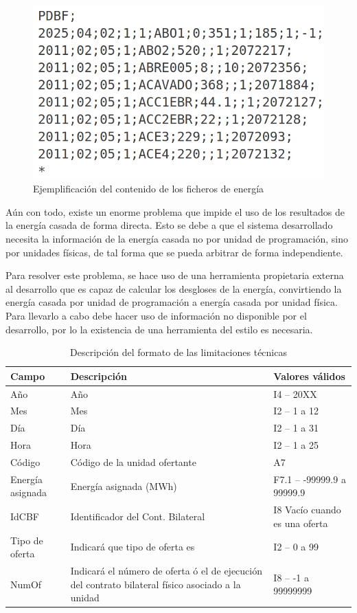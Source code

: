 \begin{figure}
  \centering
  \includegraphics[width=0.5\linewidth]{figures/contenido-energia.png}
  \caption{Ejemplificación del contenido de los ficheros de energía}
  \label{fig:contenido-energia}
\end{figure}

Aún con todo, existe un enorme problema que impide el uso de los resultados de la energía casada de forma directa. Esto se debe a que el sistema desarrollado necesita la información de la energía casada no por unidad de programación, sino por unidades físicas, de tal forma que se pueda arbitrar de forma independiente.

Para resolver este problema, se hace uso de una herramienta propietaria externa al desarrollo que es capaz de calcular los desgloses de la energía, convirtiendo la energía casada por unidad de programación a energía casada por unidad física. Para llevarlo a cabo debe hacer uso de información no disponible por el desarrollo, por lo la existencia de una herramienta del estilo es necesaria.

\begin{table}[ht]
  \centering
  \begin{tabular}{|l|p{5cm}|l|}
    \hline
    Campo & Descripción & Valores válidos\\
    \hline
    Año & Año & I4 -- 20XX\\
    Mes & Mes & I2 -- 1 a 12\\
    Día & Día & I2 -- 1 a 31\\
    Hora & Hora & I2 -- 1 a 25\\
    Código & Código de la unidad ofertante & A7\\
    Energía asignada & Energía asignada (MWh) & F7.1 – -99999.9 a 99999.9\\
    IdCBF & Identificador del Cont. Bilateral & I8 Vacío cuando es una oferta\\
    Tipo de oferta & Indicará que tipo de oferta es & I2 – 0 a 99\\
    NumOf & Indicará el número de oferta ó el de ejecución del contrato bilateral físico asociado a la unidad & I8 – -1 a 99999999\\
    \hline
  \end{tabular}
  \caption{Descripción del formato de las limitaciones técnicas}
  \label{tab:descripción-limitaciones}
\end{table}

